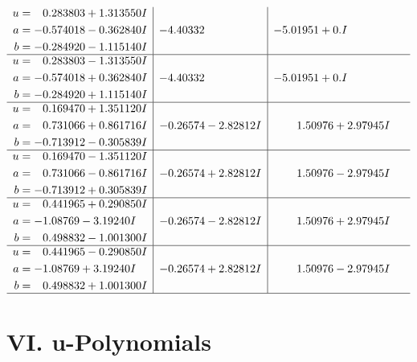 \documentclass[1p]{elsarticle_modified}
\theoremstyle{definition}
\begin{document}
$$\begin{array}{c|c|c}
\begin{aligned}
u &= \phantom{-}0.283803 + 1.313550 I \\
a &= -0.574018 - 0.362840 I \\
b &= -0.284920 - 1.115140 I\end{aligned}
 & -4.40332\phantom{ +0.000000I} & -5.01951 + 0. I\phantom{ +0.000000I} \\ \hline\begin{aligned}
u &= \phantom{-}0.283803 - 1.313550 I \\
a &= -0.574018 + 0.362840 I \\
b &= -0.284920 + 1.115140 I\end{aligned}
 & -4.40332\phantom{ +0.000000I} & -5.01951 + 0. I\phantom{ +0.000000I} \\ \hline\begin{aligned}
u &= \phantom{-}0.169470 + 1.351120 I \\
a &= \phantom{-}0.731066 + 0.861716 I \\
b &= -0.713912 - 0.305839 I\end{aligned}
 & -0.26574 - 2.82812 I & \phantom{-}1.50976 + 2.97945 I \\ \hline\begin{aligned}
u &= \phantom{-}0.169470 - 1.351120 I \\
a &= \phantom{-}0.731066 - 0.861716 I \\
b &= -0.713912 + 0.305839 I\end{aligned}
 & -0.26574 + 2.82812 I & \phantom{-}1.50976 - 2.97945 I \\ \hline\begin{aligned}
u &= \phantom{-}0.441965 + 0.290850 I \\
a &= -1.08769 - 3.19240 I \\
b &= \phantom{-}0.498832 - 1.001300 I\end{aligned}
 & -0.26574 - 2.82812 I & \phantom{-}1.50976 + 2.97945 I \\ \hline\begin{aligned}
u &= \phantom{-}0.441965 - 0.290850 I \\
a &= -1.08769 + 3.19240 I \\
b &= \phantom{-}0.498832 + 1.001300 I\end{aligned}
 & -0.26574 + 2.82812 I & \phantom{-}1.50976 - 2.97945 I\\
 \hline 
 \end{array}$$\newpage
\newpage\renewcommand{\arraystretch}{1}
\centering \section*{ VI. u-Polynomials}
\end{document}
